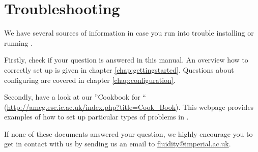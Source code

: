 \chapter{Troubleshooting}

We have several sources of information in case you run into trouble installing or running \fluidity.

Firstly, check if your question is answered in this manual. An overview how to correctly set up \fluidity is given in chapter \ref{chap:gettingstarted}.
Questions about configuring \fluidity are covered in chapter \ref{chap:configuration}.

Secondly, have a look at our ''Cookbook for \fluidity`` (\url{http://amcg.ese.ic.ac.uk/index.php?title=Cook_Book}). This webpage provides examples of how to set up particular types of problems in \fluidity. 

If none of these documents answered your question, we highly encourage you to get in contact with us by sending us an email to \url{fluidity@imperial.ac.uk}.
